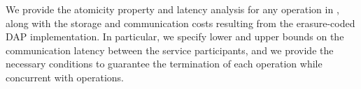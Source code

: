 %		
			We provide the atomicity property %
			and latency analysis for any 
			operation in \ares{}, along with the storage and communication costs resulting from the erasure-coded DAP implementation.
		In particular, we specify lower and upper bounds on the communication latency between the service participants,
		and we provide the necessary conditions 
		to guarantee the termination of each  operation 
		while concurrent with  operations.  
			
